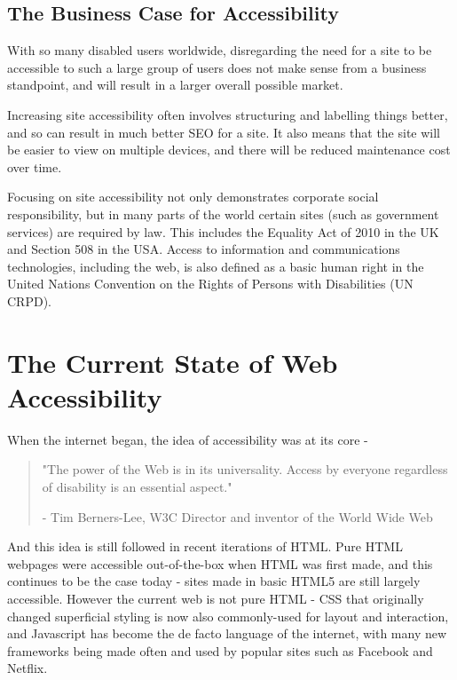 \documentclass[ %
                    author={Aleena Baig},
                supervisor={Dr Simon Lock},
                    degree={BSc},
                     title={On Making Web Accessible Graphs},
                  subtitle={},
                      year={2019} ]{dissertation}
\begin{document}
\subsection{The Business Case for Accessibility}

With so many disabled users worldwide, disregarding the need for a site to be accessible to such a large group of users does not make sense from a business standpoint, and will result in a larger overall possible market.

Increasing site accessibility often involves structuring and labelling things better, and so can result in much better SEO for a site. It also means that the site will be easier to view on multiple devices, and there will be reduced maintenance cost over time.\cite{WAIaccessibilityintro}

Focusing on site accessibility not only demonstrates corporate social responsibility, but in many parts of the world certain sites (such as government services) are required by law. This includes the Equality Act of 2010 \cite{eqa2010} in the UK and Section 508 \cite{section508} in the USA. Access to information and communications technologies, including the web, is also defined as a basic human right in the United Nations Convention on the Rights of Persons with Disabilities (UN CRPD). \cite{accessibilityUN}

\section{The Current State of Web Accessibility}

When the internet began, the idea of accessibility was at its core - 

\begin{quote} 
\centering 
"The power of the Web is in its universality. Access by everyone regardless of disability is an essential aspect."

- Tim Berners-Lee, W3C Director and inventor of the World Wide Web
\end{quote}
%
And this idea is still followed in recent iterations of HTML. Pure HTML webpages were accessible out-of-the-box when HTML was first made, and this continues to be the case today - sites made in basic HTML5 are still largely accessible. However the current web is not pure HTML - CSS that originally changed superficial styling is now also commonly-used for layout and interaction, and Javascript has become the de facto language of the internet, with many new frameworks being made often and used by popular sites such as Facebook and Netflix.
\end{document}
